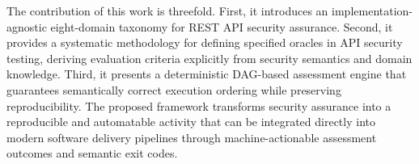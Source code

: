 The contribution of this work is threefold. First, it introduces an implementation-agnostic eight-domain taxonomy for REST API security assurance. Second, it provides a systematic methodology for defining specified oracles in API security testing, deriving evaluation criteria explicitly from security semantics and domain knowledge. Third, it presents a deterministic DAG-based assessment engine that guarantees semantically correct execution ordering while preserving reproducibility. The proposed framework transforms security assurance into a reproducible and automatable activity that can be integrated directly into modern software delivery pipelines through machine-actionable assessment outcomes and semantic exit codes.